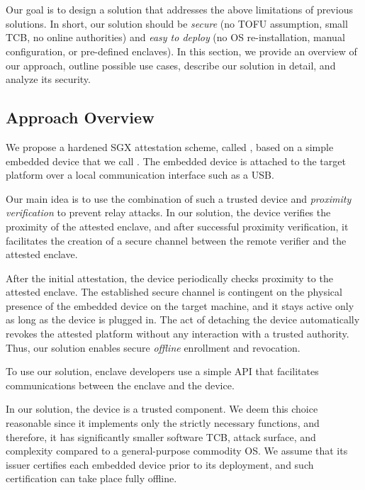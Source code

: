 \section{\name}
\label{sec:systemDesignMain}

Our goal is to design a solution that addresses the above limitations of previous solutions. In short, our solution should be \emph{secure} (no TOFU assumption, small TCB, no online authorities) and \emph{easy to deploy} (no OS re-installation, manual configuration, or pre-defined enclaves). In this section, we provide an overview of our approach, outline possible use cases, describe our solution in detail, and analyze its security.

\subsection{Approach Overview}

We propose a hardened SGX attestation scheme, called \name, based on a simple embedded device that we call \device. The embedded device is attached to the target platform over a local communication interface such as a USB. 


Our main idea is to use the combination of such a trusted device and \emph{proximity verification} to prevent relay attacks. In our solution, the \device device verifies the proximity of the attested enclave, and after successful proximity verification, it facilitates the creation of a secure channel between the remote verifier and the attested enclave. 

After the initial attestation, the device periodically checks proximity to the attested enclave. The established secure channel is contingent on the physical presence of the embedded device on the target machine, and it stays active only as long as the device is plugged in. The act of detaching the device automatically revokes the attested platform without any interaction with a trusted authority. Thus, our solution enables secure \emph{offline} enrollment and revocation. 

To use our solution, enclave developers use a simple API that facilitates communications between the enclave and the device. 


In our solution, the \device device is a trusted component. We deem this choice reasonable since it implements only the strictly necessary functions, and therefore, it has significantly smaller software TCB, attack surface, and complexity compared to a general-purpose commodity OS. We assume that its issuer certifies each embedded device prior to its deployment, and such certification can take place fully offline.

